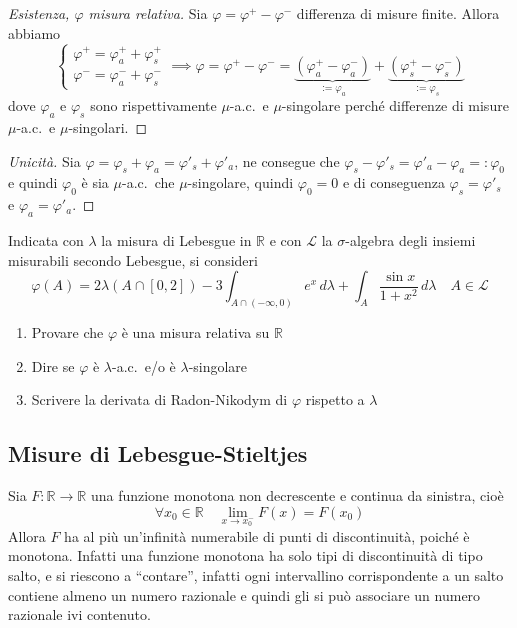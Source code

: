 \begin{proof}[Esistenza, \(\varphi \) misura relativa] Sia \(\varphi  = \varphi
    ^{+} - \varphi ^{-}\) differenza di misure finite. Allora abbiamo
    \[
        \begin{cases}
            \varphi^{+} = \varphi^{+}_a + \varphi^{+}_s \\
            \varphi^{-} = \varphi^{-}_a + \varphi^{-}_s
        \end{cases}
        \implies \varphi = \varphi^{+} - \varphi ^{-} = \underbrace{(\varphi ^{+}_a -
        \varphi ^{-}_a)}_{:=\varphi_a} + \underbrace{(\varphi ^{+}_s - \varphi
    ^{-}_s)}_{:=\varphi_s}
    \]
    dove \(\varphi_a\) e \(\varphi_s\) sono rispettivamente \(\mu\)-a.c.~e
    \(\mu\)-singolare perché differenze di misure \(\mu\)-a.c.~e \(\mu\)-singolari.
\end{proof}

\begin{proof}[Unicità]
    Sia \(\varphi = \varphi_s + \varphi_a = \varphi'_s + \varphi'_a\), ne
    consegue che \(\varphi_s - \varphi'_s = \varphi'_a - \varphi_a =:
    \varphi_0\) e quindi \(\varphi_0\) è sia \(\mu\)-a.c.~che \(\mu\)-singolare,
    quindi \(\varphi_0 = 0\) e di conseguenza \(\varphi_s = \varphi'_s\) e
    \(\varphi_a = \varphi'_a\).
\end{proof}

\begin{eser}[Es. 2 del 23\--01\--2019]
    Indicata con \(\lambda\) la misura di Lebesgue in \(\mathbb{R}\) e con
    \(\mathcal{L}\) la \(\sigma\)-algebra degli insiemi misurabili secondo
    Lebesgue, si consideri 
    \[
        \varphi {(A)} = 2\lambda {(A \cap [0, 2])} - 3 \int _{A \cap (-\infty,
        0)} e^{x} \,d\lambda + \int _A \frac{\sin x}{1 + x^2} \,d\lambda \quad A
        \in \mathcal{L}
    \]
\begin{enumerate}[label = \alph*.]
    \item Provare che \(\varphi \) è una misura relativa su \(\mathbb{R}\) 
    \item Dire se \(\varphi \) è \(\lambda\)-a.c.~e/o è \(\lambda\)-singolare
    \item Scrivere la derivata di Radon-Nikodym di \(\varphi \) rispetto a \(\lambda\) 
\end{enumerate}
\end{eser}
\subsection{Misure di Lebesgue-Stieltjes}
Sia \(F : \mathbb{R} \to \mathbb{R}\) una funzione monotona non decrescente e
continua da sinistra, cioè 
\[
    \forall x_{0} \in \mathbb{R} \quad \lim_{x \to x_{0}^{-}} F{(x)} = F{(x_{0})}
\]
Allora \(F\) ha al più un'infinità numerabile di punti di discontinuità, poiché
è monotona. Infatti una funzione monotona ha solo tipi di discontinuità di tipo
salto, e si riescono a ``contare'', infatti ogni intervallino corrispondente a
un salto contiene almeno un numero razionale e quindi gli si può associare un
numero razionale ivi contenuto.

